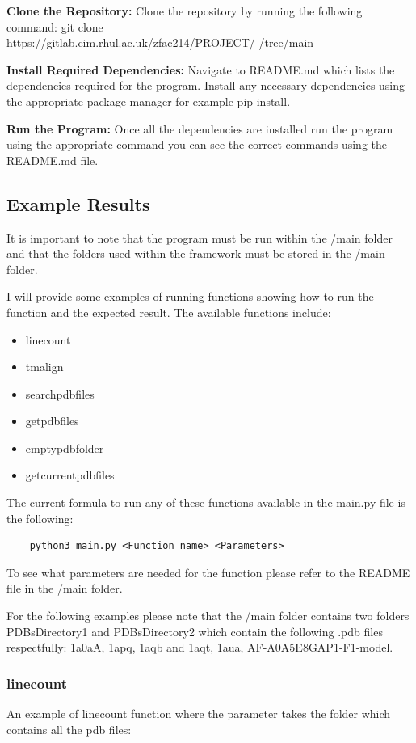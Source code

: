 \documentclass[]{final_report}
\begin{document}
\textbf{Clone the Repository:} Clone the repository by running the following command: git clone https://gitlab.cim.rhul.ac.uk/zfac214/PROJECT/-/tree/main

\textbf{Install Required Dependencies:} Navigate to README.md which lists the dependencies required for the program. Install any necessary dependencies using the appropriate package manager for example pip install.

\textbf{Run the Program:} Once all the dependencies are installed run the program using the appropriate command you can see the correct commands using the README.md file.

\clearpage

\subsection{Example Results}

It is important to note that the program must be run within the /main folder and that the folders used within the framework must be stored in the /main folder.

I will provide some examples of running functions showing how to run the function and the expected result. The available functions include:

\begin{itemize}
    \item linecount
    \item tmalign
    \item searchpdbfiles
    \item getpdbfiles
    \item emptypdbfolder
    \item getcurrentpdbfiles
\end{itemize}

The current formula to run any of these functions available in the main.py file is the following:

\begin{lstlisting}
    python3 main.py <Function name> <Parameters>
\end{lstlisting}
To see what parameters are needed for the function please refer to the README file in the /main folder.

For the following examples please note that the /main folder contains two folders PDBsDirectory1 and PDBsDirectory2 which contain the following .pdb files respectfully: 1a0aA, 1apq, 1aqb and 1aqt, 1aua, AF-A0A5E8GAP1-F1-model.

\subsubsection{linecount}
An example of linecount function where the parameter takes the folder which contains all the pdb files:
\end{document}
